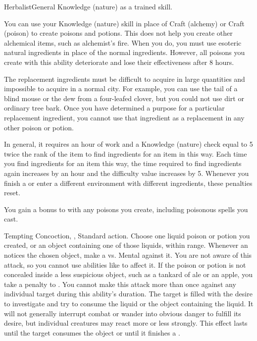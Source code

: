   \begin{feat}{Herbalist}{General}
    \featpre Knowledge (nature) as a trained skill.

     You can use your Knowledge (nature) skill in place of Craft (alchemy) or Craft (poison) to create poisons and potions.
    This does not help you create other alchemical items, such as alchemist's fire.
    When you do, you must use esoteric natural ingredients in place of the normal ingredients.
    However, all poisons you create with this ability deteriorate and lose their effectiveness after 8 hours.

    The replacement ingredients must be difficult to acquire in large quantities and impossible to acquire in a normal city.
    For example, you can use the tail of a blind mouse or the dew from a four-leafed clover, but you could not use dirt or ordinary tree bark.
    Once you have determined a purpose for a particular replacement ingredient, you cannot use that ingredient as a replacement in any other poison or potion.

    In general, it requires an hour of work and a Knowledge (nature) check equal to 5 \add twice the rank of the item to find ingredients for an item in this way.
    Each time you find ingredients for an item this way, the time required to find ingredients again increases by an hour and the difficulty value increases by 5.
    Whenever you finish a  or enter a different environment with different ingredients, these penalties reset.

     You gain a  bonus to  with any poisons you create, including poisonous spells you cast.

    \begin{magicalattuneability}{Tempting Concoction}{, , }
      \abilityusagetime Standard action.
      \rankline
      Choose one liquid poison or potion you created, or an object containing one of those liquids, within \rngshort range.
      Whenever an  notices the chosen object, make a  vs. Mental against it.
      You are not aware of this attack, so you cannot use abilities like  to affect it.
      If the poison or potion is not concealed inside a less suspicious object, such as a tankard of ale or an apple, you take a  penalty to .
      You cannot make this attack more than once against any individual target during this ability's duration.
      \hit The target is filled with the desire to investigate and try to consume the liquid or the object containing the liquid.
      It will not generally interrupt combat or wander into obvious danger to fulfill its desire, but individual creatures may react more or less strongly.
      This effect lasts until the target consumes the object or until it finishes a .


\end{magicalattuneability}
\end{feat}
